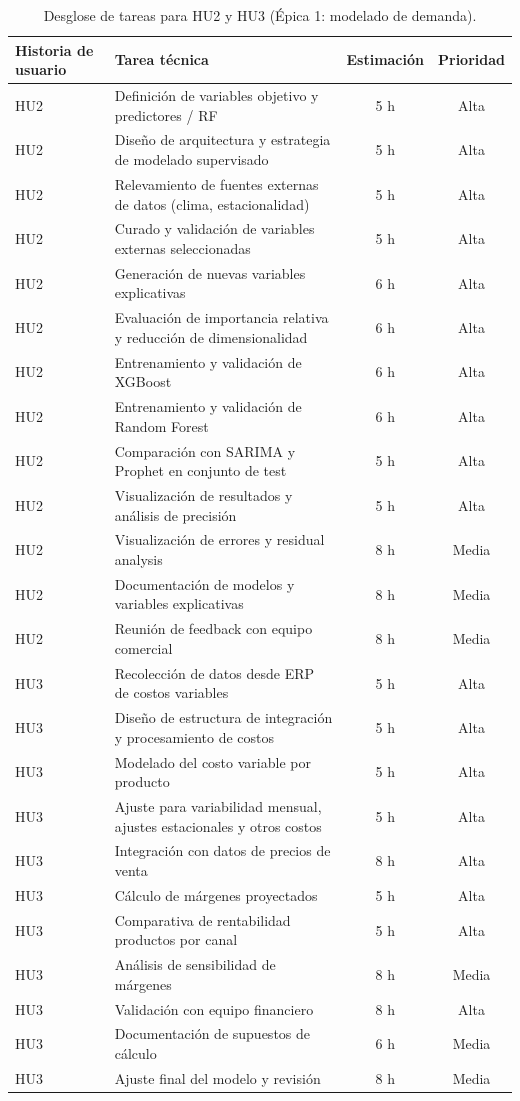 \documentclass[
11pt, %
]{charter}
\begin{document}
\begin{table}[H]
\centering
\begin{tabular}{|l|p{6cm}|c|c|}
\hline
\textbf{Historia de usuario} & \textbf{Tarea técnica} & \textbf{Estimación} & \textbf{Prioridad} \\
\hline
HU2 & Definición de variables objetivo y predictores / RF & 5 h & Alta \\
HU2 & Diseño de arquitectura y estrategia de modelado supervisado & 5 h & Alta \\
HU2 & Relevamiento de fuentes externas de datos (clima, estacionalidad) & 5 h & Alta \\
HU2 & Curado y validación de variables externas seleccionadas & 5 h & Alta \\
HU2 & Generación de nuevas variables explicativas & 6 h & Alta \\
HU2 & Evaluación de importancia relativa y reducción de dimensionalidad & 6 h & Alta \\
HU2 & Entrenamiento y validación de XGBoost & 6 h & Alta \\
HU2 & Entrenamiento y validación de Random Forest & 6 h & Alta \\
HU2 & Comparación con SARIMA y Prophet en conjunto de test & 5 h & Alta \\
HU2 & Visualización de resultados y análisis de precisión & 5 h & Alta \\
HU2 & Visualización de errores y residual analysis & 8 h & Media \\
HU2 & Documentación de modelos y variables explicativas & 8 h & Media \\
HU2 & Reunión de feedback con equipo comercial & 8 h & Media \\
\hline
HU3 & Recolección de datos desde ERP de costos variables & 5 h & Alta \\
HU3 & Diseño de estructura de integración y procesamiento de costos & 5 h & Alta \\
HU3 & Modelado del costo variable por producto & 5 h & Alta \\
HU3 & Ajuste para variabilidad mensual, ajustes estacionales y otros costos & 5 h & Alta \\
HU3 & Integración con datos de precios de venta & 8 h & Alta \\
HU3 & Cálculo de márgenes proyectados & 5 h & Alta \\
HU3 & Comparativa de rentabilidad productos por canal & 5 h & Alta \\
HU3 & Análisis de sensibilidad de márgenes & 8 h & Media \\
HU3 & Validación con equipo financiero & 8 h & Alta \\
HU3 & Documentación de supuestos de cálculo & 6 h & Media \\
HU3 & Ajuste final del modelo y revisión & 8 h & Media \\
\hline
\end{tabular}
\caption{Desglose de tareas para HU2 y HU3 (Épica 1: modelado de demanda).}
\end{table}
\end{document}
